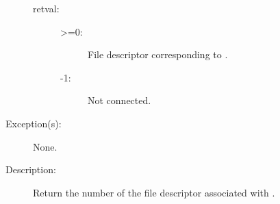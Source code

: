 \begin{description}
\begin{description}
\begin{description}
		\item[retval: ]
			\begin{description}\item[]
			\item[>=0: ]
				File descriptor corresponding to .
			\item[-1: ]
				Not connected.
			\end{description}
		\end{description}
	\item[Exception(s): ] None.
	\item[Description: ]
		Return the number of the file descriptor associated with
		.
	\end{description}
\end{description}
